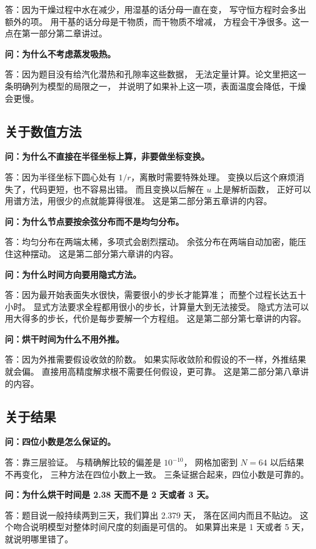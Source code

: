 答：因为干燥过程中水在减少，用湿基的话分母一直在变，
写守恒方程时会多出额外的项。
用干基的话分母是干物质，而干物质不增减，
方程会干净很多。这一点在第一部分第二章讲过。

\textbf{问：为什么不考虑蒸发吸热。}

答：因为题目没有给汽化潜热和孔隙率这些数据，
无法定量计算。论文里把这一条明确列为模型的局限之一，
并说明了如果补上这一项，表面温度会降低，干燥会更慢。

\subsection{关于数值方法}

\textbf{问：为什么不直接在半径坐标上算，非要做坐标变换。}

答：因为半径坐标下圆心处有 $1/r$，离散时需要特殊处理。
变换以后这个麻烦消失了，代码更短，也不容易出错。
而且变换以后解在 $u$ 上是解析函数，
正好可以用谱方法，用很少的点就能算得很准。
这是第二部分第五章讲的内容。

\textbf{问：为什么节点要按余弦分布而不是均匀分布。}

答：均匀分布在两端太稀，多项式会剧烈摆动。
余弦分布在两端自动加密，能压住这种摆动。
这是第二部分第六章讲的内容。

\textbf{问：为什么时间方向要用隐式方法。}

答：因为最开始表面失水很快，需要很小的步长才能算准；
而整个过程长达五十小时。
显式方法要求全程都用很小的步长，计算量大到无法接受。
隐式方法可以用大得多的步长，代价是每步要解一个方程组。
这是第二部分第七章讲的内容。

\textbf{问：烘干时间为什么不用外推。}

答：因为外推需要假设收敛的阶数。
如果实际收敛阶和假设的不一样，外推结果就会偏。
直接用高精度解求根不需要任何假设，更可靠。
这是第二部分第八章讲的内容。

\subsection{关于结果}

\textbf{问：四位小数是怎么保证的。}

答：靠三层验证。
与精确解比较的偏差是 $10^{-10}$，
网格加密到 $N=64$ 以后结果不再变化，
三种方法在四位小数上一致。
三条证据合起来，四位小数是可靠的。

\textbf{问：为什么烘干时间是 2.38 天而不是 2 天或者 3 天。}

答：题目说一般持续两到三天，我们算出 2.379 天，
落在区间内而且不贴边。
这个吻合说明模型对整体时间尺度的刻画是可信的。
如果算出来是 1 天或者 5 天，就说明哪里错了。


